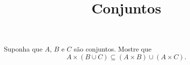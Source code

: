 \documentclass{beamer}
\title{Conjuntos}
\author[\autor]{\autor}
\institute[\instituto]{\instituto}
\date{}
\begin{document}
    \begin{frame}
        \maketitle
    \end{frame}


    \begin{frame}
        \begin{exercicio}
            Suponha que $A$, $B$ e $C$ s\~ao conjuntos. Mostre que
            \[
                A \times (B \cup C) \subseteq (A \times B) \cup (A \times C).
            \]
        \end{exercicio}

        \vspace{6cm}
    \end{frame}
\end{document}
